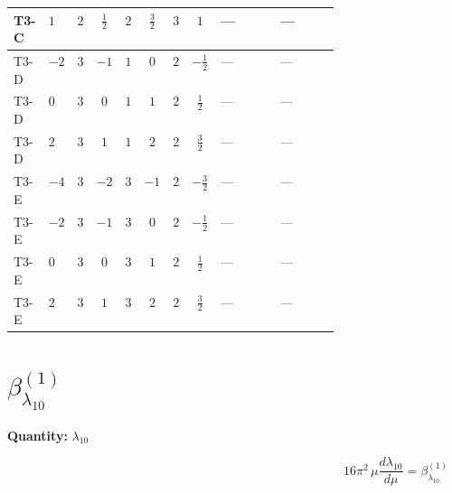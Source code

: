 \documentclass[8pt]{article}
\begin{document}
\begin{landscape}
\begin{longtable}{@{}llcccccc >{\raggedright\arraybackslash}p{0.21\linewidth} >{\raggedright\arraybackslash}p{0.21\linewidth}@{}}
\midrule
T3-C & $1$ & $2$ & $\frac{1}{2}$ & $2$ & $\frac{3}{2}$ & $3$ & $1$ & --- & --- \\
\midrule
T3-D & $-2$ & $3$ & $-1$ & $1$ & $0$ & $2$ & $-\frac{1}{2}$ & --- & --- \\
\midrule
T3-D & $0$ & $3$ & $0$ & $1$ & $1$ & $2$ & $\frac{1}{2}$ & --- & --- \\
\midrule
T3-D & $2$ & $3$ & $1$ & $1$ & $2$ & $2$ & $\frac{3}{2}$ & --- & --- \\
\midrule
T3-E & $-4$ & $3$ & $-2$ & $3$ & $-1$ & $2$ & $-\frac{3}{2}$ & --- & --- \\
\midrule
T3-E & $-2$ & $3$ & $-1$ & $3$ & $0$ & $2$ & $-\frac{1}{2}$ & --- & --- \\
\midrule
T3-E & $0$ & $3$ & $0$ & $3$ & $1$ & $2$ & $\frac{1}{2}$ & --- & --- \\
\midrule
T3-E & $2$ & $3$ & $1$ & $3$ & $2$ & $2$ & $\frac{3}{2}$ & --- & --- \\
\midrule
\bottomrule
\end{longtable}
\clearpage
\section*{$\beta_{\lambda_{10}}^{(1)}$}
\noindent\textbf{Quantity: }$\lambda_{10}$\par\smallskip
\[16\pi^2\,\mu\frac{d \lambda_{10}}{d\mu}=\beta_{\lambda_{10}}^{(1)}\]

\end{landscape}
\end{document}
